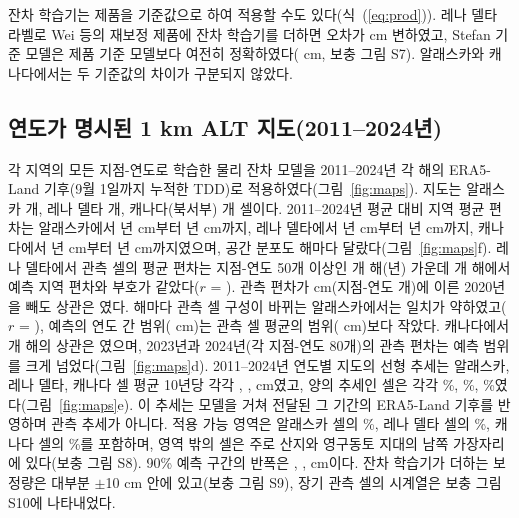 잔차 학습기는 제품을 기준값으로 하여 적용할 수도 있다(식~(\ref{eq:prod})). 레나 델타 라벨로 Wei 등의 재보정 제품에 잔차 학습기를 더하면 오차가 \npadLeRpPcal{} cm 변하였고, Stefan 기준 모델은 제품 기준 모델보다 여전히 정확하였다(\npadLeRoRp{} cm, 보충 그림 S7). 알래스카와 캐나다에서는 두 기준값의 차이가 구분되지 않았다.

\subsection{연도가 명시된 1 km ALT 지도(2011--2024년)}
각 지역의 모든 지점-연도로 학습한 물리 잔차 모델을 2011--2024년 각 해의 ERA5-Land 기후(9월 1일까지 누적한 TDD)로 적용하였다(그림~\ref{fig:maps}). 지도는 알래스카 \nncellmapAk{}개, 레나 델타 \nncellmapLe{}개, 캐나다(북서부) \nncellmapCa{}개 셀이다. 2011--2024년 평균 대비 지역 평균 편차는 알래스카에서 \nanminyrAk{}년 \nanminAk{} cm부터 \nanmaxyrAk{}년 \nanmaxAk{} cm까지, 레나 델타에서 \nanminyrLe{}년 \nanminLe{} cm부터 \nanmaxyrLe{}년 \nanmaxLe{} cm까지, 캐나다에서 \nanminyrCa{}년 \nanminCa{} cm부터 \nanmaxyrCa{}년 \nanmaxCa{} cm까지였으며, 공간 분포도 해마다 달랐다(그림~\ref{fig:maps}f). 레나 델타에서 관측 셀의 평균 편차는 지점-연도 50개 이상인 \nanobsnLe{}개 해(\nanobsyrsLe{}년) 가운데 \nanobssameLe{}개 해에서 예측 지역 편차와 부호가 같았다($r$ = \nanobsrLe). 관측 편차가 \nanobsLeTwentyObs{} cm(지점-연도 \nanobsLeTwentyN{}개)에 이른 2020년을 빼도 상관은 \nanobsrLeNoTwenty{}였다. 해마다 관측 셀 구성이 바뀌는 알래스카에서는 일치가 약하였고($r$ = \nanobsrAk), 예측의 연도 간 범위(\nanpredrangeAk{} cm)는 관측 셀 평균의 범위(\nanobsrangeAk{} cm)보다 작았다. 캐나다에서 \nanobsnCa{}개 해의 상관은 \nanobsrCa{}였으며, 2023년과 2024년(각 지점-연도 80개)의 관측 편차는 예측 범위를 크게 넘었다(그림~\ref{fig:maps}d). 2011--2024년 연도별 지도의 선형 추세는 알래스카, 레나 델타, 캐나다 셀 평균 10년당 각각 \ntrendAk{}, \ntrendLe{}, \ntrendCa{} cm였고, 양의 추세인 셀은 각각 \ntrendposAk\%, \ntrendposLe\%, \ntrendposCa\%였다(그림~\ref{fig:maps}e). 이 추세는 모델을 거쳐 전달된 그 기간의 ERA5-Land 기후를 반영하며 관측 추세가 아니다. 적용 가능 영역은 알래스카 셀의 \naoaAk\%, 레나 델타 셀의 \naoaLe\%, 캐나다 셀의 \naoaCa\%를 포함하며, 영역 밖의 셀은 주로 산지와 영구동토 지대의 남쪽 가장자리에 있다(보충 그림 S8). 90\% 예측 구간의 반폭은 \nhwAk{}, \nhwLe{}, \nhwCa{} cm이다. 잔차 학습기가 더하는 보정량은 대부분 $\pm$10 cm 안에 있고(보충 그림 S9), 장기 관측 셀의 시계열은 보충 그림 S10에 나타내었다.

